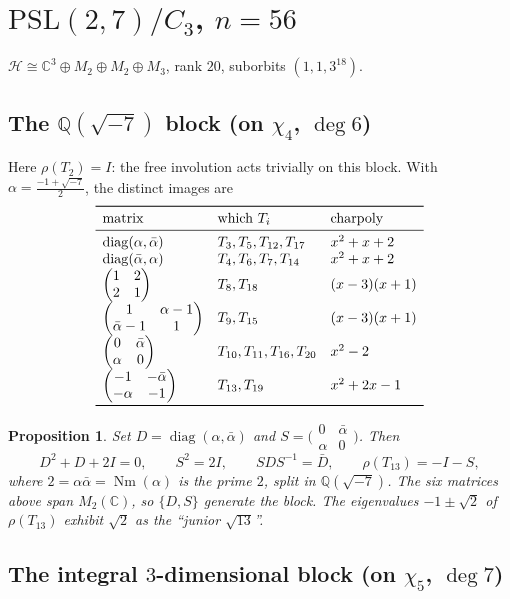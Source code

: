 \documentclass[11pt]{article}
\newtheorem{proposition}[theorem]{Proposition}
\theoremstyle{remark}
\newcommand{\C}{\mathbb{C}}
\newcommand{\Q}{\mathbb{Q}}
\newcommand{\Nm}{\operatorname{Nm}}
\newcommand{\T}[1]{T_{#1}}
\newcommand{\mat}[4]{\begin{pmatrix} #1 & #2 \\ #3 & #4 \end{pmatrix}}
\begin{document}
\section{$\mathrm{PSL}(2,7)/C_3$, $n=56$}\label{sec:psl27}

$\mathcal H \cong \C^3\oplus M_2\oplus M_2\oplus M_3$, rank $20$,
suborbits $(1,1,3^{18})$.

\subsection{The $\Q(\sqrt{-7})$ block (on $\chi_4$, $\deg 6$)}

Here $\rho(\T2)=I$: the free involution acts trivially on this block.
With $\alpha=\frac{-1+\sqrt{-7}}{2}$, the distinct images are
\[
\begin{array}{lll}
\toprule
\text{matrix} & \text{which } \T i & \text{charpoly}\\
\midrule
\operatorname{diag}(\alpha,\bar\alpha) & \T3,\T5,\T{12},\T{17} & x^2+x+2\\
\operatorname{diag}(\bar\alpha,\alpha) & \T4,\T6,\T7,\T{14} & x^2+x+2\\
\mat{1}{2}{2}{1} & \T8,\T{18} & (x-3)(x+1)\\
\mat{1}{\alpha-1}{\bar\alpha-1}{1} & \T9,\T{15} & (x-3)(x+1)\\
\mat{0}{\bar\alpha}{\alpha}{0} & \T{10},\T{11},\T{16},\T{20} & x^2-2\\
\mat{-1}{-\bar\alpha}{-\alpha}{-1} & \T{13},\T{19} & x^2+2x-1\\
\bottomrule
\end{array}
\]

\begin{proposition}\label{prop:psl27a}
Set $D=\operatorname{diag}(\alpha,\bar\alpha)$ and
$S=\bigl(\begin{smallmatrix}0&\bar\alpha\\ \alpha&0\end{smallmatrix}\bigr)$.
Then
\[
D^2+D+2I=0,\qquad \boxed{S^2 = 2I},\qquad SDS^{-1}=\bar D,
\qquad \rho(\T{13}) = -I - S,
\]
where $2=\alpha\bar\alpha=\Nm(\alpha)$ is the prime $2$, split in
$\Q(\sqrt{-7})$. The six matrices above span $M_2(\C)$, so $\{D,S\}$
generate the block. The eigenvalues $-1\pm\sqrt2$ of $\rho(\T{13})$
exhibit $\sqrt2$ as the ``junior $\sqrt{13}$''.
\end{proposition}

\subsection{The integral $3$-dimensional block (on $\chi_5$, $\deg 7$)}
\end{document}
